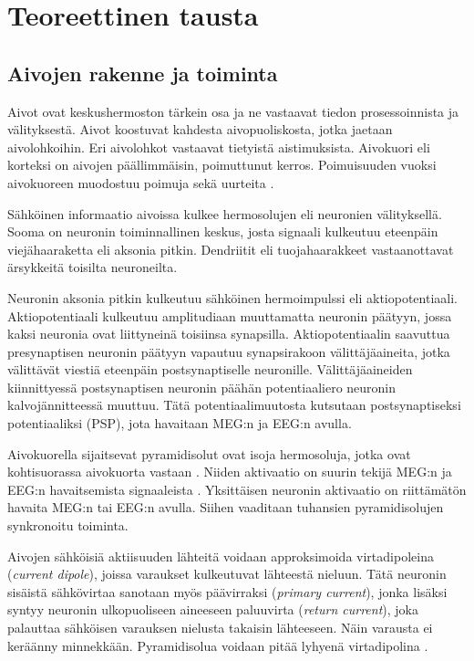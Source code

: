 \section{Teoreettinen tausta}

\subsection{Aivojen rakenne ja toiminta}
Aivot ovat keskushermoston tärkein osa ja ne vastaavat tiedon prosessoinnista ja välityksestä. Aivot koostuvat kahdesta aivopuoliskosta, jotka jaetaan aivolohkoihin. Eri aivolohkot vastaavat tietyistä aistimuksista. Aivokuori eli korteksi on aivojen päällimmäisin, poimuttunut kerros. \citep{Hamalainen1993MagnetoencephalographytheoryBrain} Poimuisuuden vuoksi aivokuoreen muodostuu poimuja sekä uurteita \citep{hansen2010meg}. 

Sähköinen informaatio aivoissa kulkee hermosolujen eli neuronien välityksellä. Sooma on neuronin toiminnallinen keskus, josta signaali kulkeutuu eteenpäin viejähaaraketta eli aksonia pitkin. Dendriitit eli tuojahaarakkeet vastaanottavat ärsykkeitä toisilta neuroneilta. \citep{Hamalainen1993MagnetoencephalographytheoryBrain}

Neuronin aksonia pitkin kulkeutuu sähköinen hermoimpulssi eli aktiopotentiaali. Aktiopotentiaali kulkeutuu amplitudiaan muuttamatta neuronin päätyyn, jossa kaksi neuronia ovat liittyneinä toisiinsa synapsilla. Aktiopotentiaalin saavuttua presynaptisen neuronin päätyyn vapautuu synapsirakoon välittäjäaineita, jotka välittävät viestiä eteenpäin postsynaptiselle neuronille. Välittäjäaineiden kiinnittyessä postsynaptisen neuronin päähän potentiaaliero neuronin kalvojännitteessä muuttuu. Tätä potentiaalimuutosta kutsutaan postsynaptiseksi potentiaaliksi (PSP), jota havaitaan MEG:n ja EEG:n avulla. \citep{Hamalainen1993MagnetoencephalographytheoryBrain}

Aivokuorella sijaitsevat pyramidisolut ovat isoja hermosoluja, jotka ovat kohtisuorassa aivokuorta vastaan \citep{Hamalainen1993MagnetoencephalographytheoryBrain}. Niiden aktivaatio on suurin tekijä MEG:n ja EEG:n havaitsemista signaaleista \citep{HariMEGprimer}. Yksittäisen neuronin aktivaatio on riittämätön havaita MEG:n tai EEG:n avulla. Siihen vaaditaan tuhansien pyramidisolujen synkronoitu toiminta. \citep{He2018ElectrophysiologicalDynamics}

Aivojen sähköisiä aktiisuuden lähteitä voidaan approksimoida virtadipoleina (\textit{current dipole}), joissa varaukset kulkeutuvat lähteestä nieluun. Tätä neuronin sisäistä sähkövirtaa sanotaan myös päävirraksi (\textit{primary current}), jonka lisäksi syntyy neuronin ulkopuoliseen aineeseen paluuvirta (\textit{return current}), joka palauttaa sähköisen varauksen nielusta takaisin lähteeseen. Näin varausta ei keräänny minnekkään. \citep[s. 6-7]{HariMEGprimer} Pyramidisolua voidaan pitää lyhyenä virtadipolina \citep[s. 10]{HariMEGprimer}.

